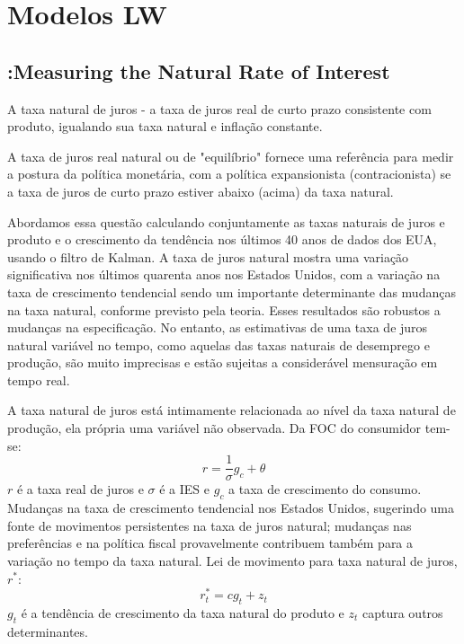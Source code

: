 \chapter{Modelos LW}


\section{\citet{LW:2003}:Measuring the Natural Rate of Interest }
A taxa natural de juros - a taxa de juros real de curto prazo consistente com produto, igualando sua taxa natural e inflação constante.

A taxa de juros real natural ou de "equilíbrio" fornece uma referência para medir a postura da política monetária, com a política expansionista (contracionista) se a taxa de juros de curto prazo estiver abaixo (acima) da taxa natural.

Abordamos essa questão calculando conjuntamente as taxas naturais de juros e produto e o crescimento da tendência nos últimos 40 anos de dados dos EUA, usando o filtro de Kalman. A taxa de juros natural mostra uma variação significativa nos últimos quarenta anos nos Estados Unidos, com a variação na taxa de crescimento tendencial sendo um importante determinante das mudanças na taxa natural, conforme previsto pela teoria. Esses resultados são robustos a mudanças na especificação. No entanto, as estimativas de uma taxa de juros natural variável no tempo, como aquelas das taxas naturais de desemprego e produção, são muito imprecisas e estão sujeitas a considerável mensuração em tempo real.

A taxa natural de juros está intimamente relacionada ao nível da taxa natural de produção, ela própria uma variável não observada. Da FOC do consumidor tem-se: 
\begin{equation}
    r = \dfrac{1}{\sigma} g_c + \theta
\end{equation}
$r$ é a taxa real de juros e $\sigma$ é a IES e $g_c$ a taxa de crescimento do consumo. Mudanças na taxa de crescimento tendencial nos Estados Unidos, sugerindo uma fonte de movimentos persistentes na taxa de juros natural; mudanças nas preferências e na política fiscal provavelmente contribuem também para a variação no tempo da taxa natural. Lei de movimento para taxa natural de juros, $r^{*}$:
\begin{equation}
    r_t^{*} = cg_t + z_t
\end{equation}
$g_t$ é a tendência de crescimento da taxa natural do produto e $z_t$ captura outros determinantes.

